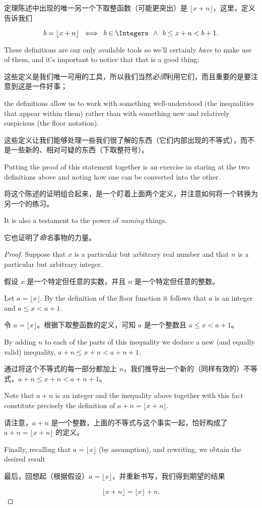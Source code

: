 定理陈述中出现的唯一另一个下取整函数（可能更突出）是 $\lfloor x + n\rfloor$，这里，定义告诉我们

\[ b = \lfloor x + n \rfloor \; \iff \;
      b \in \Integers \; \, \land \; \, b \leq x + n < b+1.
\]

These definitions are our only available tools so we'll certainly \emph{have}
to make use of them, and it's important to notice that that is a good thing;

这些定义是我们唯一可用的工具，所以我们当然\emph{必须}利用它们，而且重要的是要注意到这是一件好事；

the definitions allow us to work with something well-understood
(the inequalities that appear within them) rather than with something
new and relatively suspicious (the floor notation).

这些定义让我们能够处理一些我们很了解的东西（它们内部出现的不等式），而不是一些新的、相对可疑的东西（下取整符号）。

Putting the proof
of this statement together is an exercise in staring at the two definitions
above and noting how one can be converted into the other.

将这个陈述的证明组合起来，是一个盯着上面两个定义，并注意如何将一个转换为另一个的练习。

It is also a
testament to the power of \emph{naming} things.

它也证明了\emph{命名}事物的力量。

\begin{proof}
      Suppose that $x$ is a particular but arbitrary real number
      and that $n$ is a particular but arbitrary integer.

      假设 $x$ 是一个特定但任意的实数，并且 $n$ 是一个特定但任意的整数。

      Let
      $a = \lfloor x \rfloor$.  By the definition of the floor function
      it follows that $a$ is an integer and $a \leq x < a+1$.

      令 $a = \lfloor x \rfloor$。根据下取整函数的定义，可知 $a$ 是一个整数且 $a \leq x < a+1$。

      By adding
      $n$ to each of the parts of this inequality
      we deduce a new (and equally valid) inequality, $a+n \leq x+n < a+n+1$.

      通过将这个不等式的每一部分都加上 $n$，我们推导出一个新的（同样有效的）不等式，$a+n \leq x+n < a+n+1$。

      Note that $a+n$ is an integer and the inequality above together with
      this fact constitute precisely the definition of
      $a + n = \lfloor x + n \rfloor$.

      请注意，$a+n$ 是一个整数，上面的不等式与这个事实一起，恰好构成了 $a + n = \lfloor x + n \rfloor$ 的定义。

      Finally, recalling that
      $a = \lfloor x \rfloor$ (by assumption), and rewriting, we obtain the
      desired result

      最后，回想起（根据假设）$a = \lfloor x \rfloor$，并重新书写，我们得到期望的结果

      \[ \lfloor x + n \rfloor = \lfloor x \rfloor + n.
      \]

\end{proof}

